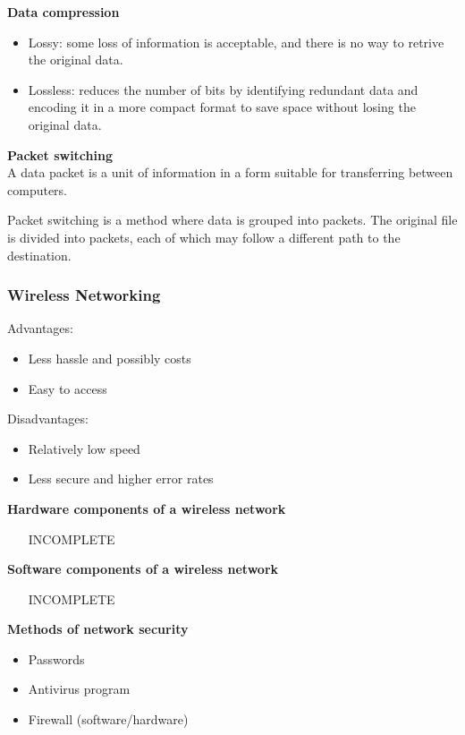 \documentclass{article}
\begin{document}
\textbf{Data compression}
\begin{itemize}
    \item Lossy: some loss of information is acceptable, and there is no way to
        retrive the original data.
    \item Lossless: reduces the number of bits by identifying redundant data
        and encoding it in a more compact format to save space without losing
        the original data.
\end{itemize}

\textbf{Packet switching} \\
A data packet is a unit of information in a form suitable for transferring
between computers.

Packet switching is a method where data is grouped into packets. The original
file is divided into packets, each of which may follow a different path to the
destination.

\subsubsection{Wireless Networking}

Advantages:
\begin{itemize}
    \item Less hassle and possibly costs
    \item Easy to access
\end{itemize}
Disadvantages:
\begin{itemize}
    \item Relatively low speed
    \item Less secure and higher error rates
\end{itemize}

\textbf{Hardware components of a wireless network}
\begin{itemize}
    \item [INCOMPLETE]
\end{itemize}

\textbf{Software components of a wireless network}
\begin{itemize}
    \item [INCOMPLETE]
\end{itemize}

\textbf{Methods of network security}
\begin{itemize}
    \item Passwords
    \item Antivirus program
    \item Firewall (software/hardware)
\end{itemize}
\end{document}
